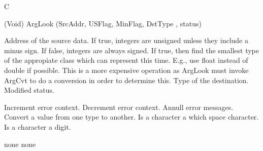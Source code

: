 \begin{manroutinedescription}
      C

      (Void) {\mantt{=}} ArgLook (SrcAddr, USFlag, MinFlag, DstType , status)

\begin{manparametertable}
     Address of the %
source data.
	If true, integers are unsigned %
unless
				they include a minus sign.  If false,
				integers are always signed.
   If true, then find the %
smallest type of the
				appropiate class which can represent this
				time.  E.g., use float instead of double
				if possible.  This is a more expensive operation
				as ArgLook must invoke ArgCvt to do a conversion
				in order to determine this.
	     Type of %
the destination.
 Modified status.

\end{manparametertable}
\begin{manfunctiontable}
   Increment error context.
   Decrement error context.
   Annull error messages.
\manfunctionblank
{}   Convert a value from one type to another.
\manfunctionblank
{}  Is a character a which space %
character.
  Is a character a digit.
\end{manfunctiontable}
      none
      none

\end{manroutinedescription}
